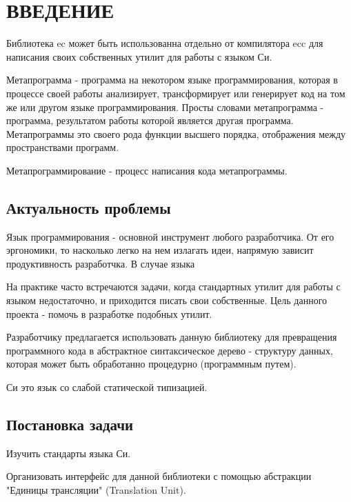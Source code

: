 \chapter*{ВВЕДЕНИЕ}                         %

Библиотека ec может быть использованна отдельно от компилятора ecc для написания своих собственных утилит для работы с языком Си.


Метапрограмма - программа на некотором языке программирования, которая в процессе своей работы анализирует, трансформирует или генерирует код на том же или другом языке программирования.
Просты словами метапрограмма - программа, результатом работы которой является другая программа.
Метапрограммы это своего рода функции высшего порядка\cite{wiki-hof}, отображения между пространствами программ.

Метапрограммирование - процесс написания кода метапрограммы.
\section*{Актуальность проблемы}
Язык программирования - основной инструмент любого разработчика. От его эргономики, то насколько легко на нем излагать идеи, напрямую зависит продуктивность разработчка.
В случае языка

На практике часто встречаются задачи, когда стандартных утилит для работы с языком недостаточно, и приходится писать свои собственные.
Цель данного проекта - помочь в разработке подобных утилит.

Разработчику предлагается использовать данную библиотеку для превращения программного кода в абстрактное синтаксическое дерево - 
структуру данных, которая может быть обработанно процедурно (программным путем).

Си это язык со слабой статической типизацией.

\def\titlecite#1{\citetitle{#1}\cite{#1}}

\section*{Постановка задачи}
Изучить стандарты\cite{c99_std}\cite{c23_std} языка Си.

Организовать интерфейс для данной библиотеки с помощью абстракции "Единицы трансляции" (Translation Unit)\cite{wiki-tr-unit}.


